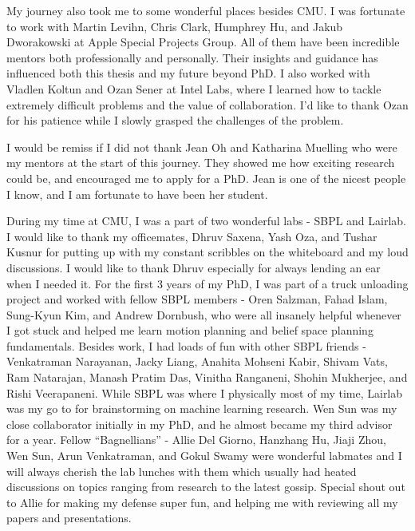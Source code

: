 \documentclass[11pt]{cmuthesis}
\begin{document}
\begin{acknowledgments}
  My journey also took me to some wonderful places besides CMU. I was
  fortunate to work with Martin Levihn, Chris Clark, Humphrey Hu, and
  Jakub Dworakowski at Apple Special Projects Group. All of them have
  been incredible mentors both professionally and personally. Their
  insights and guidance has influenced both this thesis and my future
  beyond PhD. I also worked with Vladlen Koltun and Ozan Sener at
  Intel Labs, where I learned how to tackle extremely difficult
  problems and the value of collaboration. I'd like to thank Ozan for
  his patience while I slowly grasped the
  challenges of the problem.

  I would be remiss if I did not thank Jean Oh and Katharina Muelling
  who were my mentors at the start of this journey. They showed me how
  exciting research could be, and encouraged me to apply for a
  PhD. Jean is one of the nicest people I know, and I am
  fortunate to have been her student.

  During my time at CMU, I was a part of two wonderful labs - SBPL and
  Lairlab. I would like to thank my officemates, Dhruv Saxena, Yash Oza, and
  Tushar Kusnur for putting up with my constant scribbles on the whiteboard
  and my loud discussions. I would like to thank Dhruv especially for
  always lending an ear when I needed it. For the first 3 years of my
  PhD, I was part of a truck unloading project and worked with fellow
  SBPL members - Oren
  Salzman, Fahad Islam,
  Sung-Kyun Kim, and Andrew Dornbush, who were all insanely helpful whenever I got stuck
  and helped me learn motion planning and belief space planning
  fundamentals. Besides work, I had loads of fun with other SBPL
  friends - Venkatraman Narayanan, Jacky Liang, Anahita Mohseni Kabir,
  Shivam Vats, Ram Natarajan, Manash Pratim Das, Vinitha Ranganeni,
  Shohin Mukherjee, and 
  Rishi Veerapaneni. While SBPL was where I physically most of my time, Lairlab
  was my go to for brainstorming on machine learning research. Wen Sun
  was my close collaborator initially in my PhD, and he almost became
  my third advisor for a year. Fellow ``Bagnellians'' -  Allie Del
  Giorno, Hanzhang Hu, Jiaji 
  Zhou, Wen Sun, Arun Venkatraman, and Gokul Swamy
  were wonderful labmates and I will always cherish the lab lunches
  with them which usually had heated discussions on topics ranging
  from research to the latest gossip. Special shout out to Allie for
  making my defense super fun, and helping me with reviewing all my
  papers and presentations. 


\end{acknowledgments}
\end{document}
